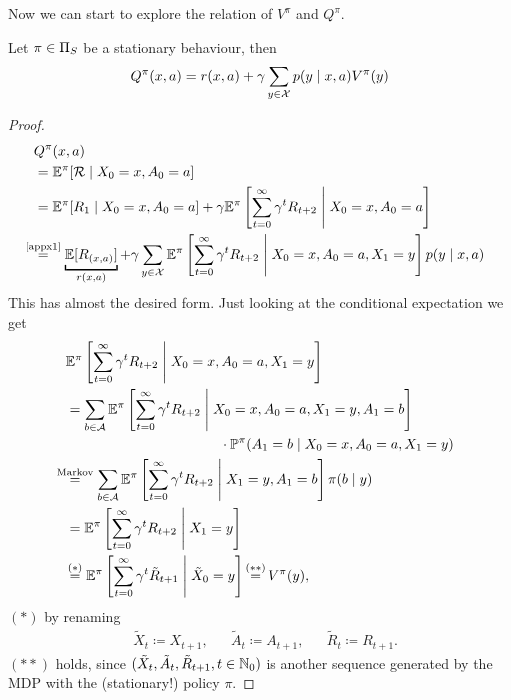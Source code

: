 Now we can start to explore the relation of \(V^\pi\) and \(Q^\pi\).

\begin{prop}\label{expand Q^pi} Let \(\pi\in\Pi_S\) be a stationary behaviour, then
	\[Q^\pi(x,a)=r(x,a)+\gamma\sum_{y\in\mathcal{X}}p(y\mid x,a)V^\pi(y)\]
\end{prop}

\begin{proof}\leavevmode
\begin{align*}
&Q^\pi(x,a) \\
&= \E^\pi[\cR\mid X_0=x, A_0=a]\\
&=\E^\pi[R_1\mid X_0=x,A_0=a]
+\gamma\E^\pi\left[\sum_{t=0}^\infty\gamma^t R_{t+2}\;\middle|\; X_0=x,A_0=a\right]\\
&\lxeq{\text{\ref{appx1}}} \underbracket[1pt]{\E[R_{(x,a)}]}_{r(x,a)} 
 + \gamma \sum_{y\in\cX}\E^\pi\left[\sum_{t=0}^\infty\gamma^t R_{t+2} \;\middle|\; X_0=x,A_0=a, X_1=y\right]p(y\mid x, a)\\
\end{align*}
This has almost the desired form. Just looking at the conditional expectation we get
\begin{align*}
	&\E^\pi\left[\sum_{t=0}^\infty\gamma^t R_{t+2} \;\middle|\; X_0=x,A_0=a, X_1=y\right]\\
	&=\sum_{b\in\cA}
	\begin{aligned}[t]
	&\E^\pi\left[\sum_{t=0}^\infty\gamma^t R_{t+2} 
	\;\middle|\; X_0=x,A_0=a, X_1=y,A_1=b \right]\\
	&\qquad\qquad\qquad\qquad\cdot \Pr^\pi(A_1=b \mid X_0=x,A_0=a, X_1=y) 
	\end{aligned}
	\\
	&\lxeq{\text{Markov}} 
	\sum_{b\in\cA}\E^\pi\left[\sum_{t=0}^\infty\gamma^t R_{t+2} \;\middle|\; X_1=y,A_1=b \right]
	\pi(b\mid y)\\
	&= \E^\pi\left[\sum_{t=0}^\infty\gamma^t R_{t+2}\;\middle|\; X_1=y \right] \\
 	&\lxeq{(*)} \E^\pi\left[\sum_{t=0}^\infty\gamma^t \tilde{R}_{t+1}\;\middle|\; \tilde{X}_0=y \right]\xeq{(**)}V^\pi(y),
\end{align*}
\((*)\) by renaming 
\begin{align*}
	&\tilde{X}_{t}\coloneqq X_{t+1}, && \tilde{A}_t\coloneqq A_{t+1},
	&&\tilde{R}_{t}\coloneqq R_{t+1}.
\end{align*}
\((**)\) holds, since \((\tilde{X}_t,\tilde{A}_t,\tilde{R}_{t+1}, t\in\mathbb{N}_0)\) is another sequence generated by the MDP with the (stationary!) policy \(\pi\).
\end{proof}

